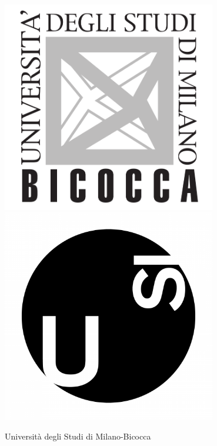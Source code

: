 \documentclass[a4paper,12pt,twoside,openright]{book}
\begin{document}



\begin{titlepage}
	\begin{minipage}{0.30\linewidth}
		\includegraphics[width=0.7\textwidth]{./img/logo-bicocca-bw.png}\\%
		\includegraphics[width=0.7\textwidth]{./img/press-usi-immagini-logo-square.png}%
	\end{minipage}	
	\begin{minipage}{0.67\linewidth}
		\begin{flushleft}
			{\large Università degli Studi di Milano-Bicocca} \\[0.4cm]

\end{flushleft}
\end{minipage}
\end{titlepage}
\end{document}
